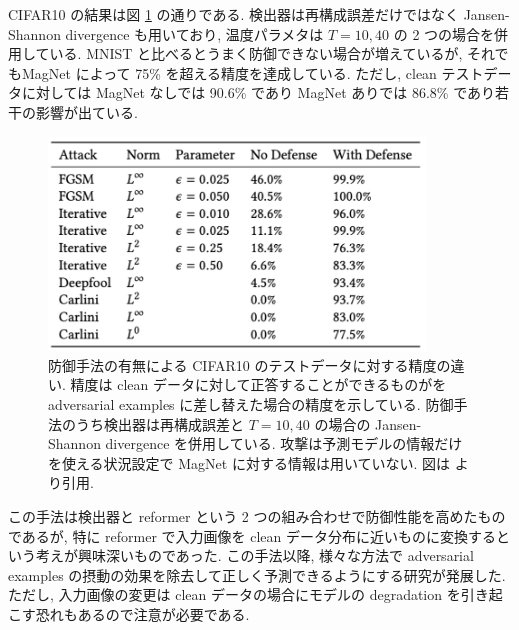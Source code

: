 CIFAR10 の結果は図 \ref{fig:magnet-result-cifar10} の通りである.
検出器は再構成誤差だけではなく Jansen-Shannon divergence も用いており, 温度パラメタは $T=10, 40$ の 2 つの場合を併用している.
MNIST と比べるとうまく防御できない場合が増えているが, それでもMagNet によって 75\% を超える精度を達成している.
ただし, clean テストデータに対しては MagNet なしでは 90.6\% であり MagNet ありでは 86.8\% であり若干の影響が出ている.
%
\begin{figure}[htbp]
\begin{center}
\includegraphics[width=10.0cm]{figures/magnet-result-cifar10.pdf}
\end{center}
\caption{
防御手法の有無による CIFAR10 のテストデータに対する精度の違い.
精度は clean データに対して正答することができるものがを adversarial examples に差し替えた場合の精度を示している.
防御手法のうち検出器は再構成誤差と $T=10, 40$ の場合の Jansen-Shannon divergence を併用している.
攻撃は予測モデルの情報だけを使える状況設定で MagNet に対する情報は用いていない.
図は \cite{meng2017magnet} より引用.
}
\label{fig:magnet-result-cifar10}
\end{figure}
%

この手法は検出器と reformer という 2 つの組み合わせで防御性能を高めたものであるが, 特に reformer で入力画像を clean データ分布に近いものに変換するという考えが興味深いものであった.
この手法以降, 様々な方法で adversarial examples の摂動の効果を除去して正しく予測できるようにする研究が発展した.
ただし, 入力画像の変更は clean データの場合にモデルの degradation を引き起こす恐れもあるので注意が必要である.



